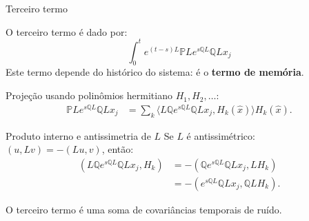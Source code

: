 \begin{frame}{Terceiro termo}

O terceiro termo é dado por:
\begin{equation*}
	\int_0^t e^{(t-s)L} \mathbb{P}L e^{s\mathbb{Q}L} \mathbb{Q}L x_j
\end{equation*}
Este termo depende do histórico do sistema: é o \textbf{termo de memória}.

Projeção usando polinômios hermitiano $H_1, H_2, \dots$:
\begin{align*}
	\mathbb{P}L e^{s\mathbb{Q}L} \mathbb{Q}L x_j &= \sum_k \langle L\mathbb{Q} e^{s\mathbb{Q}L} \mathbb{Q}Lx_j, H_k(\hat{x}) \rangle H_k(\hat{x}).
\end{align*}
\end{frame}


\begin{frame}{Produto interno e antissimetria de $L$}
Se $L$ é antissimétrico: $(u, Lv) = -(Lu, v)$, então:
\begin{align*}
	(L \mathbb{Q} e^{s \mathbb{Q} L} \mathbb{Q}L x_j, H_k) 
	  &= - (\mathbb{Q} e^{s \mathbb{Q} L} \mathbb{Q}L x_j, L H_k) \\
	  &= - (e^{s \mathbb{Q} L} \mathbb{Q}L x_j, \mathbb{Q}L H_k).
\end{align*}

O terceiro termo é uma soma de covariâncias temporais de ruído.
\end{frame}
